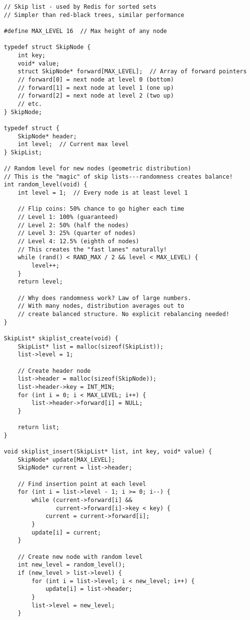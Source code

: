 \begin{lstlisting}
// Skip list - used by Redis for sorted sets
// Simpler than red-black trees, similar performance

#define MAX_LEVEL 16  // Max height of any node

typedef struct SkipNode {
    int key;
    void* value;
    struct SkipNode* forward[MAX_LEVEL];  // Array of forward pointers
    // forward[0] = next node at level 0 (bottom)
    // forward[1] = next node at level 1 (one up)
    // forward[2] = next node at level 2 (two up)
    // etc.
} SkipNode;

typedef struct {
    SkipNode* header;
    int level;  // Current max level
} SkipList;

// Random level for new nodes (geometric distribution)
// This is the "magic" of skip lists---randomness creates balance!
int random_level(void) {
    int level = 1;  // Every node is at least level 1

    // Flip coins: 50% chance to go higher each time
    // Level 1: 100% (guaranteed)
    // Level 2: 50% (half the nodes)
    // Level 3: 25% (quarter of nodes)
    // Level 4: 12.5% (eighth of nodes)
    // This creates the "fast lanes" naturally!
    while (rand() < RAND_MAX / 2 && level < MAX_LEVEL) {
        level++;
    }
    return level;

    // Why does randomness work? Law of large numbers.
    // With many nodes, distribution averages out to
    // create balanced structure. No explicit rebalancing needed!
}

SkipList* skiplist_create(void) {
    SkipList* list = malloc(sizeof(SkipList));
    list->level = 1;

    // Create header node
    list->header = malloc(sizeof(SkipNode));
    list->header->key = INT_MIN;
    for (int i = 0; i < MAX_LEVEL; i++) {
        list->header->forward[i] = NULL;
    }

    return list;
}

void skiplist_insert(SkipList* list, int key, void* value) {
    SkipNode* update[MAX_LEVEL];
    SkipNode* current = list->header;

    // Find insertion point at each level
    for (int i = list->level - 1; i >= 0; i--) {
        while (current->forward[i] &&
               current->forward[i]->key < key) {
            current = current->forward[i];
        }
        update[i] = current;
    }

    // Create new node with random level
    int new_level = random_level();
    if (new_level > list->level) {
        for (int i = list->level; i < new_level; i++) {
            update[i] = list->header;
        }
        list->level = new_level;
    }


\end{lstlisting}
